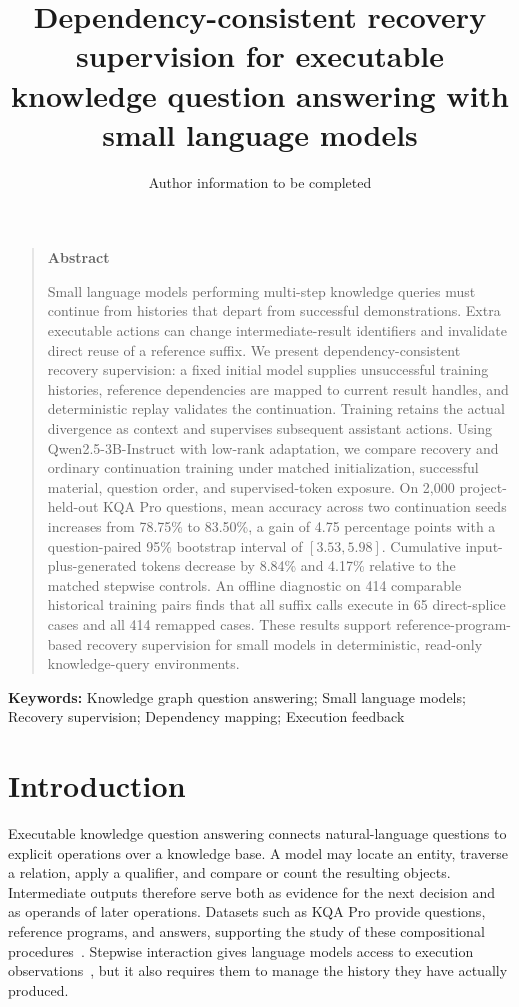 \documentclass[a4paper,12pt]{article}
\title{Dependency-consistent recovery supervision for executable knowledge question answering with small language models}
\author{Author information to be completed}
\date{}
\renewenvironment{abstract}{\begin{quote}\noindent\textbf{Abstract}\par\normalsize}{\end{quote}}
\begin{document}
\maketitle

\begin{abstract}
Small language models performing multi-step knowledge queries must continue from histories that depart from successful demonstrations. Extra executable actions can change intermediate-result identifiers and invalidate direct reuse of a reference suffix. We present dependency-consistent recovery supervision: a fixed initial model supplies unsuccessful training histories, reference dependencies are mapped to current result handles, and deterministic replay validates the continuation. Training retains the actual divergence as context and supervises subsequent assistant actions. Using Qwen2.5-3B-Instruct with low-rank adaptation, we compare recovery and ordinary continuation training under matched initialization, successful material, question order, and supervised-token exposure. On 2,000 project-held-out KQA Pro questions, mean accuracy across two continuation seeds increases from 78.75\% to 83.50\%, a gain of 4.75 percentage points with a question-paired 95\% bootstrap interval of $[3.53,5.98]$. Cumulative input-plus-generated tokens decrease by 8.84\% and 4.17\% relative to the matched stepwise controls. An offline diagnostic on 414 comparable historical training pairs finds that all suffix calls execute in 65 direct-splice cases and all 414 remapped cases. These results support reference-program-based recovery supervision for small models in deterministic, read-only knowledge-query environments.
\end{abstract}

\noindent\textbf{Keywords:} Knowledge graph question answering; Small language models; Recovery supervision; Dependency mapping; Execution feedback

\section{Introduction}

Executable knowledge question answering connects natural-language questions to explicit operations over a knowledge base. A model may locate an entity, traverse a relation, apply a qualifier, and compare or count the resulting objects. Intermediate outputs therefore serve both as evidence for the next decision and as operands of later operations. Datasets such as KQA Pro provide questions, reference programs, and answers, supporting the study of these compositional procedures~\cite{cao2022kqapro}. Stepwise interaction gives language models access to execution observations~\cite{yao2023react}, but it also requires them to manage the history they have actually produced.
\end{document}
